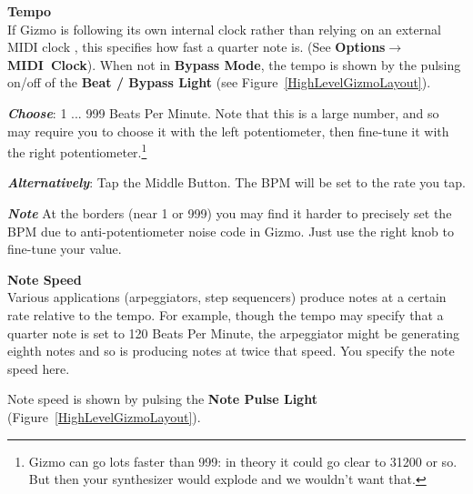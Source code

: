 \documentclass{article}
\begin{document}
	\begin{description}


	\item{\bf Tempo}\\
	If Gizmo is following its own internal clock rather than relying on an external MIDI clock , this specifies how fast a quarter note is.  (See {\bf Options\(\boldsymbol\rightarrow\)MIDI~Clock}).  When not in {\bf Bypass Mode}, the tempo is shown by the pulsing on/off of the {\bf Beat / Bypass Light} (see Figure~\ref{HighLevelGizmoLayout}). 
	
\begin{description}
		\item{\bf \textit{Choose}}: 1 ... 999 Beats Per Minute.  Note that this is a large number, and so may require you to choose it with the left potentiometer, then fine-tune it with the right potentiometer.\footnote{Gizmo can go lots faster than 999: in theory it could go clear to 31200 or so.  But then your synthesizer would explode and we wouldn't want that.}
		\item{\bf \textit{Alternatively}}: Tap the Middle Button.  The BPM will be set to the rate you tap.
   		\item{\bf \textit{Note}} At the borders (near 1 or 999) you may find it harder to precisely set the BPM due to anti-potentiometer noise code in Gizmo. Just use the right knob to fine-tune your value. 
		\end{description}
		
	\item{\bf Note Speed}\\
		Various applications (arpeggiators, step sequencers)
		produce notes at a certain rate relative to the tempo.
		For example, though the tempo may specify that a
		quarter note is set to 120 Beats Per Minute, the 
		arpeggiator might be generating eighth notes and
		so is producing notes at twice that speed.  You specify the 
		note speed here.
		
		Note speed is shown by pulsing the {\bf Note Pulse Light} (Figure~\ref{HighLevelGizmoLayout}).


\end{description}
\end{document}
